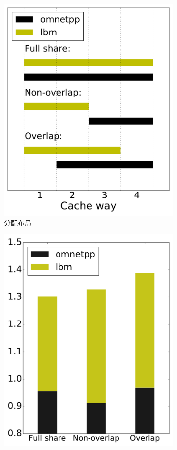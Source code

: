 \begin{figure}[htbp] 
    \centering
    \begin{subfigure}[b]{0.4\linewidth}
        \centering\includegraphics[width=0.9\linewidth]{figures/scheme.pdf}
        \caption{分配布局}
    \end{subfigure}%
    \begin{subfigure}[b]{0.4\linewidth}
        \centering\includegraphics[width=0.9\linewidth]{figures/throughput.pdf}

\end{subfigure}
\end{figure}
